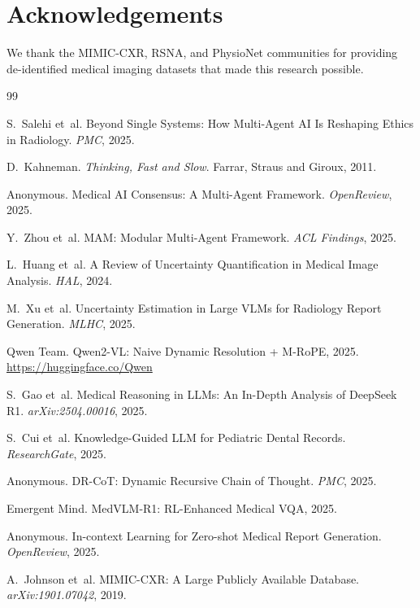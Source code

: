 \documentclass[10pt,twocolumn]{article}
\begin{document}
\section*{Acknowledgements}

We thank the MIMIC-CXR, RSNA, and PhysioNet communities for providing
de-identified medical imaging datasets that made this research possible.


\begin{thebibliography}{99}

S.~Salehi et~al.
Beyond Single Systems: How Multi-Agent AI Is Reshaping Ethics in Radiology.
\emph{PMC}, 2025.

D.~Kahneman.
\emph{Thinking, Fast and Slow}.
Farrar, Straus and Giroux, 2011.

Anonymous.
Medical AI Consensus: A Multi-Agent Framework.
\emph{OpenReview}, 2025.

Y.~Zhou et~al.
MAM: Modular Multi-Agent Framework.
\emph{ACL Findings}, 2025.

L.~Huang et~al.
A Review of Uncertainty Quantification in Medical Image Analysis.
\emph{HAL}, 2024.

M.~Xu et~al.
Uncertainty Estimation in Large VLMs for Radiology Report Generation.
\emph{MLHC}, 2025.

Qwen Team.
Qwen2-VL: Naive Dynamic Resolution + M-RoPE, 2025.
\url{https://huggingface.co/Qwen}

S.~Gao et~al.
Medical Reasoning in LLMs: An In-Depth Analysis of DeepSeek R1.
\emph{arXiv:2504.00016}, 2025.

S.~Cui et~al.
Knowledge-Guided LLM for Pediatric Dental Records.
\emph{ResearchGate}, 2025.

Anonymous.
DR-CoT: Dynamic Recursive Chain of Thought.
\emph{PMC}, 2025.

Emergent Mind.
MedVLM-R1: RL-Enhanced Medical VQA, 2025.

Anonymous.
In-context Learning for Zero-shot Medical Report Generation.
\emph{OpenReview}, 2025.

A.~Johnson et~al.
MIMIC-CXR: A Large Publicly Available Database.
\emph{arXiv:1901.07042}, 2019.


\end{thebibliography}
\end{document}
